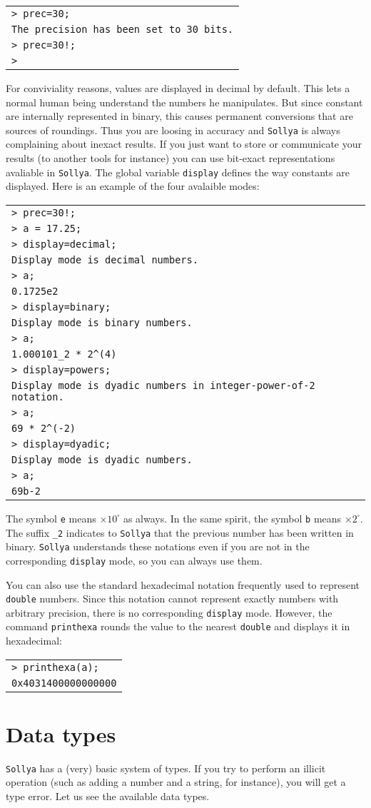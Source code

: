 \documentclass[a4paper]{article}
\newcommand{\com}[1]{\texttt{#1}}
\newcommand{\key}[1]{\texttt{#1}}
\newcommand{\sollya}{\texttt{Sollya}\xspace}
\newcommand{\code}[1]{
\begin{center}
\begin{tabular}{|p{14.8cm}|}
\hline
#1
\hline
\end{tabular}
\end{center}
}
\newcommand{\ligne}[1]{\texttt{#1}\\}
\begin{document}
\code{
\ligne{> prec=30;}
\ligne{The precision has been set to 30 bits.}
\ligne{> prec=30!;}
\ligne{>}
}

For conviviality reasons, values are displayed in decimal by default. This lets a normal human being understand the numbers he manipulates. But since constant are internally represented in binary, this causes permanent conversions that are sources of roundings. Thus you are loosing in accuracy and \sollya is always complaining about inexact results. If you just want to store or communicate your results (to another tools for instance) you can use bit-exact representations avaliable in \sollya. The global variable \key{display} defines the way constants are displayed. Here is an example of the four avalaible modes:


\code{
\ligne{> prec=30!;}
\ligne{> a = 17.25;}
\ligne{> display=decimal;}
\ligne{Display mode is decimal numbers.}
\ligne{> a;}
\ligne{0.1725e2}
\ligne{> display=binary;}
\ligne{Display mode is binary numbers.}
\ligne{> a;}
\ligne{1.000101\_2 * 2\^{}(4)}
\ligne{> display=powers;}
\ligne{Display mode is dyadic numbers in integer-power-of-2 notation.}
\ligne{> a;}
\ligne{69 * 2\^{}(-2)}
\ligne{> display=dyadic;}
\ligne{Display mode is dyadic numbers.}
\ligne{> a;}
\ligne{69b-2}
}

The symbol \texttt{e} means $\times 10^\square $ as always. In the same spirit, the symbol \texttt{b} means  $\times 2^\square $. The suffix \texttt{\_2} indicates to \sollya that the previous number has been written in binary. \sollya understands these notations even if you are not in the corresponding \key{display} mode, so you can always use them.

You can also use the standard hexadecimal notation frequently used to represent \texttt{double} numbers. Since this notation cannot represent exactly numbers with arbitrary precision, there is no corresponding \key{display} mode. However, the command \com{printhexa} rounds the value to the nearest \texttt{double} and displays it in hexadecimal:

\code{
\ligne{> printhexa(a);}
\ligne{0x4031400000000000}
}

\section{Data types}
\sollya has a (very) basic system of types. If you try to perform an illicit operation (such as adding a number and a string, for instance), you will get a type error. Let us see the available data types.
\end{document}
